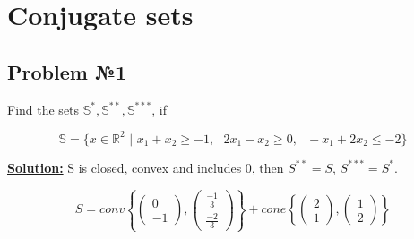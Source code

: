 \section{Conjugate sets}
\subsection{Problem №1}
Find the sets $\mathds{S}^*, \mathds{S}^{**}, \mathds{S}^{***}$, if

\begin{equation*}
    \mathds{S} = \{ x \in \mathds{R}^2 \text{ | } x_1 + x_2 \geq -1, \text{ } 2x_1 - x_2 \geq 0, \text{ } -x_1+2x_2\leq -2\}
\end{equation*}

\underline{\textbf{Solution:}}
S is closed, convex and includes 0, then $S^{**} = S$, $S^{***} = S^{*}$. 

\begin{equation*}
    S = conv \left\{ 
        \begin{pmatrix} 0  \\ -1 \end{pmatrix}, 
        \begin{pmatrix} \frac{-1}{3} \\ \frac{-2}{3} \end{pmatrix} \right\} 
    + cone \left\{ 
        \begin{pmatrix} 2  \\ 1  \end{pmatrix}, 
    \begin{pmatrix} 1  \\ 2  \end{pmatrix} \right\}
\end{equation*}

\begin{center}
\end{center}

